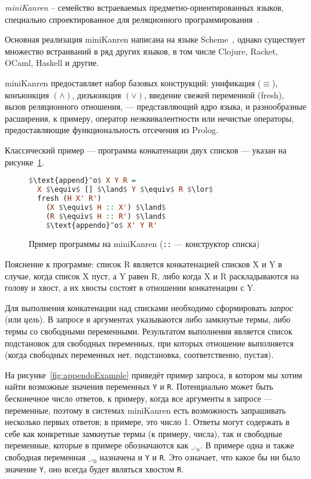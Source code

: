 {\it miniKanren} -- семейство встраеваемых предметно-ориентированных языков, специально спроектированное для
реляционного программирования~\cite{byrdMK}.

Основная реализация miniKanren написана на языке Scheme~\cite{reasonedSchemer}, однако существует множество встраиваний
в ряд других языков, в том числе Clojure, Racket, OCaml, Haskell и другие.

miniKanren предоставляет набор базовых конструкций: унификация ($\equiv$),
конъюнкция $(\land)$, дизъюнкция $(\lor)$, введение свежей переменной (fresh), вызов реляционного отношения,
--- представляющий ядро языка, и разнообразные расширения, к примеру, оператор неэквивалентности
 или нечистые операторы, предоставляющие функциональность
отсечения  из Prolog.

Классический пример --- программа конкатенации двух списков --- указан на рисунке~\ref{fig:appendo}.

\begin{figure}[h!]
\begin{lstlisting}[mathescape,language=Haskell,extendedchars=\true,frame=single,basicstyle=\ttfamily]
$\text{append}^o$ X Y R =
  X $\equiv$ [] $\land$ Y $\equiv$ R $\lor$
  fresh (H X' R')
    (X $\equiv$ H :: X') $\land$
    (R $\equiv$ H :: R') $\land$
    $\text{appendo}^o$ X' Y R'
\end{lstlisting}

\caption{Пример программы на miniKanren (\lstinline{::} --- конструктор списка)}
\label{fig:appendo}
\end{figure}

Пояснение к программе:
список R является конкатенацией списков X и Y в случае, когда список X пуст, а Y равен R, либо
когда X и R раскладываются на голову и хвост, а их хвосты состоят в отношении конкатенации с Y.

Для выполнения конкатенации над списками необходимо сформировать \emph{запрос} (или \emph{цель}).
В запросе в аргументах указываются либо замкнутые термы, либо термы со свободными переменными. Результатом
выполнения является список подстановок для свободных переменных, при которых отношение выполняется
(когда свободных переменных нет, подстановка, соответственно, пустая).

На рисунке~\ref{fig:appendoExample} приведёт пример запроса, в котором мы хотим найти возможные значения
переменных \lstinline{Y} и \lstinline{R}. Потенциально может быть бесконечное число ответов, к примеру,
когда все аргументы в запросе --- переменные, поэтому в системах miniKanren есть возможность
запрашивать несколько первых ответов; в примере, это число 1. Ответы могут содержать в себе как
конкретные замкнутые термы (к примеру, числа), так и свободные переменные, которые
в примере обозначаются как $\text{\_.}_n$. В примере одна и также свободная переменная $\text{\_.}_0$
назначена и \lstinline{Y} и \lstinline{R}. Это означает, что какое бы ни было значение \lstinline{Y}, оно всегда
будет являться хвостом \lstinline{R}.

